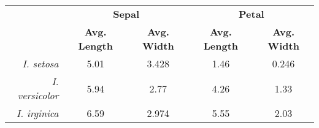 \begin{tabular}{ r | c c | c c }
\arrayrulecolor{black}
\hline
\arrayrulecolor{black!25}
\multirow{2}{*}{\textbf{Species}} &\multicolumn{2}{c|}{\textbf{Sepal}}&\multicolumn{2}{c}{\textbf{Petal}}\\
& \textbf{Avg. Length} & \textbf{Avg. Width} & \textbf{Avg. Length} & \textbf{Avg. Width}\\
\arrayrulecolor{black}\hline
\textit{I. setosa}&5.01&3.428&1.46&0.246\\
\textit{I. versicolor}&5.94&2.77&4.26&1.33\\
\textit{I. irginica}&6.59&2.974&5.55&2.03\\\hline\hline
\end{tabular}
